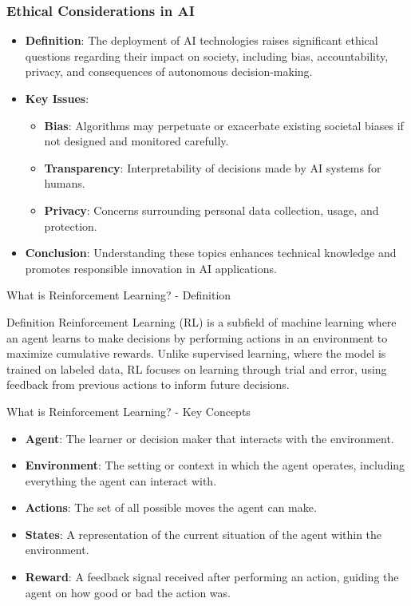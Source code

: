 \documentclass[aspectratio=169]{beamer}
\begin{document}
\begin{frame}[fragile]
    \frametitle{Ethical Considerations in AI}
    \begin{itemize}
        \item \textbf{Definition}: The deployment of AI technologies raises significant ethical questions regarding their impact on society, including bias, accountability, privacy, and consequences of autonomous decision-making.
        \item \textbf{Key Issues}:
            \begin{itemize}
                \item \textbf{Bias}: Algorithms may perpetuate or exacerbate existing societal biases if not designed and monitored carefully.
                \item \textbf{Transparency}: Interpretability of decisions made by AI systems for humans.
                \item \textbf{Privacy}: Concerns surrounding personal data collection, usage, and protection.
            \end{itemize}
        \item \textbf{Conclusion}: Understanding these topics enhances technical knowledge and promotes responsible innovation in AI applications.
    \end{itemize}
\end{frame}

\begin{frame}[fragile]{What is Reinforcement Learning? - Definition}
    \begin{block}{Definition}
        Reinforcement Learning (RL) is a subfield of machine learning where an agent learns to make decisions by performing actions in an environment to maximize cumulative rewards. 
        Unlike supervised learning, where the model is trained on labeled data, RL focuses on learning through trial and error, using feedback from previous actions to inform future decisions.
    \end{block}
\end{frame}

\begin{frame}[fragile]{What is Reinforcement Learning? - Key Concepts}
    \begin{itemize}
        \item \textbf{Agent}: The learner or decision maker that interacts with the environment.
        \item \textbf{Environment}: The setting or context in which the agent operates, including everything the agent can interact with.
        \item \textbf{Actions}: The set of all possible moves the agent can make.
        \item \textbf{States}: A representation of the current situation of the agent within the environment.
        \item \textbf{Reward}: A feedback signal received after performing an action, guiding the agent on how good or bad the action was.
    \end{itemize}
\end{frame}
\end{document}
